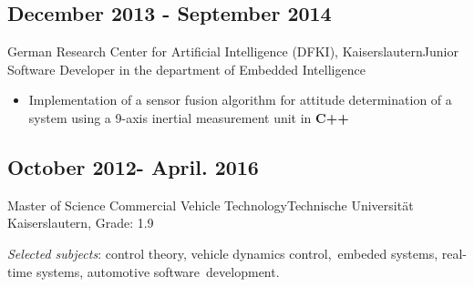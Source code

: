 \documentclass{mycv}
\begin{document}
{\rlap{\color{templateColor1}\rule[0mm]{\textwidth}{\ulinewidth}}}
\begin{paracol}{2}

\switchcolumn
{}

		\subsection{December 2013 - September 2014}{German Research Center for
			Artificial Intelligence (DFKI), \quad Kaiserslautern}{Junior Software Developer in the department of Embedded
		Intelligence} 
	  \begin{itemize}
			\item Implementation of a sensor fusion algorithm for attitude
				determination of a system using a 9-axis inertial measurement unit in
				{\bfseries C++}\\
	  \end{itemize}


		\subsection{October 2012- April. 2016}{Master of Science Commercial Vehicle
		Technology}{Technische Universit{\"a}t Kaiserslautern, {Grade: 1.9}}

		{\textit{Selected subjects}}: control theory, vehicle dynamics control,
		\,embeded systems, real-time systems, automotive	software \,development.\\


\end{paracol}
\end{document}
